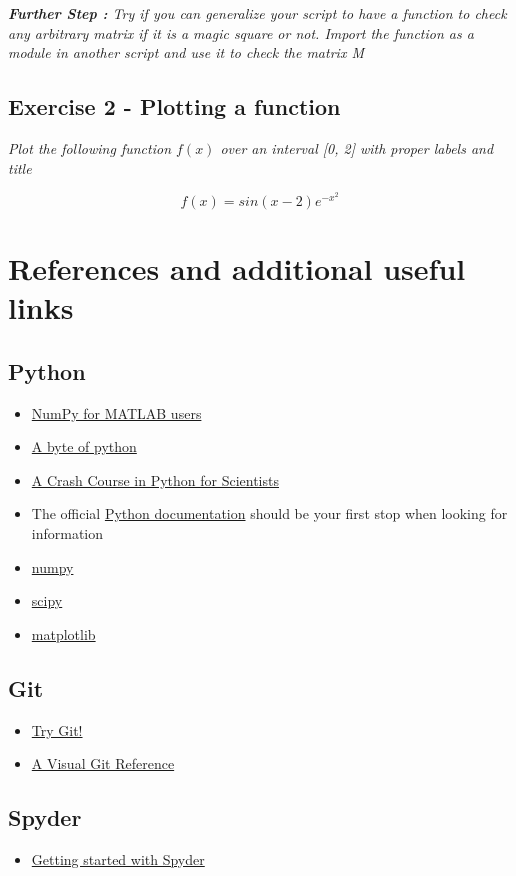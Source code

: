 \documentclass{cmc}
\begin{document}
\textit{\textbf{Further Step : } Try if you can generalize your script
  to have a function to check any arbitrary matrix if it is a magic
  square or not.  Import the function as a module in another script
  and use it to check the matrix M}

\subsection{Exercise 2 - Plotting a function}

\textit{Plot the following function $f(x)$ over an interval [0, 2]
  with proper labels and title}

\begin{equation*}
  \label{eq:3}
  f(x) = sin(x - 2)e^{-x^2}
\end{equation*}

\newpage
\section{References and additional useful links}
\label{sec:references}

\subsection{Python}
\label{sec:python_ref}
\begin{itemize}
\item
  \href{http://mathesaurus.sourceforge.net/matlab-numpy.html}{NumPy
    for MATLAB users}
\item \href{https://python.swaroopch.com}{A byte of python}
\item \href{http://nbviewer.jupyter.org/gist/rpmuller/5920182}{A Crash
    Course in Python for Scientists}
\item The official \href{https://docs.python.org/2/}{Python
    documentation} should be your first stop when looking for
  information
\item \href{http://numpy.scipy.org/}{numpy}
\item \href{http://www.scipy.org/}{scipy}
\item \href{http://matplotlib.sourceforge.net/}{matplotlib}
\end{itemize}

\subsection{Git}
\label{sec:git_ref}
\begin{itemize}
\item \href{https://try.github.io/levels/1/challenges/1}{Try Git!}
\item
  \href{https://marklodato.github.io/visual-git-guide/index-en.html}{A
    Visual Git Reference}
\end{itemize}

\subsection{Spyder}
\label{sec:spyder_ref}
\begin{itemize}
\item
  \href{http://www.southampton.ac.uk/~fangohr/blog/spyder-the-python-ide.html#first-steps-with-spyder}{Getting started with Spyder}
\end{itemize}
\end{document}
